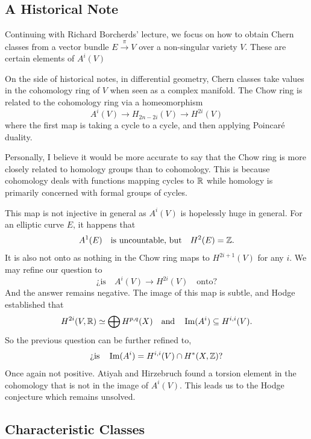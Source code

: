 \documentclass[12pt]{memoir}
\begin{document}
\subsection{A Historical Note}

Continuing with Richard Borcherds' lecture, we focus on how to obtain Chern classes from a vector bundle $E\xrightarrow{\pi}V$ over a non-singular variety $V$. These are certain elements of $A^i(V)$

    On the side of historical notes, in differential geometry, Chern classes take values in the cohomology ring of $V$ when seen as a complex manifold. The Chow ring is related to the cohomology ring via a homeomorphism 
    $$A^i(V)\to H_{2n-2i}(V)\to H^{2i}(V)$$
    where the first map is taking a cycle to a cycle, and then applying Poincaré duality.
    
    \begin{Rmk}
        Personally, I believe it would be more accurate to say that the Chow ring is more closely related to homology groups than to cohomology. This is because cohomology deals with functions mapping cycles to $\mathbb{R}$ while homology is primarily concerned with formal groups of cycles. 
    \end{Rmk}

    This map is not injective in general as $A^i(V)$ is hopelessly huge in general. For an elliptic curve $E$, it happens that 
    $$A^{1}(E)\quad\text{is uncountable, but}\quad H^{2}(E)=\mathbb{Z}.$$
    It is also not onto as nothing in the Chow ring maps to $H^{2i+1}(V)$ for any $i$. We may refine our question to 
    $$\text{¿is}\quad A^i(V)\to H^{2i}(V)\quad\text{onto?}$$ 
    And the answer remains negative. The image of this map is subtle, and Hodge established that
    $$H^{2i}(V,\mathbb{R})\simeq\bigoplus H^{p,q}(X)\quad\text{and}\quad\Im(A^i)\subseteq H^{i,i}(V).$$
    So the previous question can be further refined to, 
    $$\text{¿is}\quad \Im(A^i)=H^{i,i}(V)\cap H^\ast(X,\mathbb{Z})?$$
    Once again not positive. Atiyah and Hirzebruch found a torsion element in the cohomology that is not in the image of $A^i(V)$. This leads us to the Hodge conjecture which remains unsolved. 

\subsection{Characteristic Classes}
\end{document}
